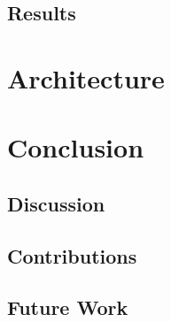 \documentclass[a4paper, 11pt]{book}
\begin{document}
\section{Results}


\chapter{Architecture}



\chapter{Conclusion}

\section{Discussion}

\section{Contributions}


\section{Future Work}







\begin{appendices}
  
  
  
\end{appendices}
\end{document}
